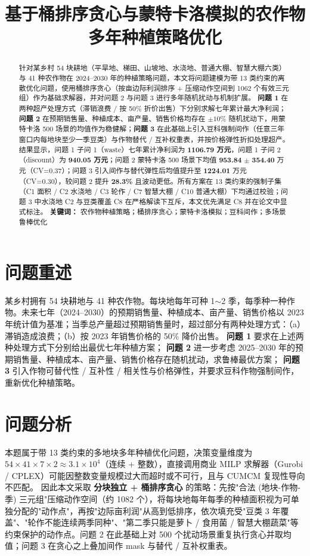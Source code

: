 \documentclass[UTF8,a4paper,12pt]{ctexart}
\title{基于桶排序贪心与蒙特卡洛模拟的农作物多年种植策略优化}
\author{}
\date{}
\begin{document}
\maketitle
\thispagestyle{plain}

\begin{abstract}
针对某乡村 54 块耕地（平旱地、梯田、山坡地、水浇地、普通大棚、智慧大棚六类）与 41 种农作物在 2024--2030 年的种植策略问题，本文将问题建模为带 13 类约束的离散优化问题，使用桶排序贪心（按亩边际利润排序 + 压缩动作空间到 1062 个有效三元组）作为基础求解器，并对问题 2 与问题 3 进行多年随机扰动与机制扩展。
\textbf{问题 1} 在两种超产处理方式（滞销浪费 / 按 50\% 折价出售）下分别求解七年累计最大净利润；\textbf{问题 2} 在预期销售量、种植成本、亩产量、销售价格均存在 $\pm 10\%$ 随机扰动下，用蒙特卡洛 500 场景的均值作为稳健解；\textbf{问题 3} 在此基础上引入豆科强制间作（任意三年窗口内每地块至少一季豆类）与作物替代 / 互补权重表，并按价格弹性折扣处理超产。结果显示，问题 1 子问 1（waste）七年累计净利润为 \textbf{1106.79 万元}，问题 1 子问 2（discount）为 \textbf{940.05 万元}；问题 2 蒙特卡洛 500 场景下均值 \textbf{953.84} $\pm$ \textbf{354.40} 万元（CV=0.37）；问题 3 引入间作与替代弹性后均值提升至 \textbf{1224.01} 万元（CV=0.30），较问题 2 提升 \textbf{28.3\%} 且波动更低。所有方案在 13 类约束的强制子集（C1 面积 / C2 水浇地 / C3 轮作 / C7 智慧大棚 / C10 普通大棚）下均通过校验；问题 3 中水浇地 C2 与豆类覆盖 C8 在严格解读下互斥，本文优先满足 C8 并在论文中显式标注。
\textbf{关键词：} 农作物种植策略；桶排序贪心；蒙特卡洛模拟；豆科间作；多场景鲁棒优化
\end{abstract}
\newpage

\section{问题重述}
某乡村拥有 54 块耕地与 41 种农作物。每块地每年可种 1$\sim$2 季，每季种一种作物。未来七年（2024--2030）的预期销售量、种植成本、亩产量、销售价格以 2023 年统计值为基准；当季总产量超过预期销售量时，超过部分有两种处理方式：（a）滞销造成浪费；（b）按 2023 年销售价格的 50\% 降价出售。
\textbf{问题 1} 要求在上述两种处理方式下分别给出最优七年种植方案；
\textbf{问题 2} 进一步考虑 2025--2030 年的预期销售量、种植成本、亩产量、销售价格存在随机扰动，求鲁棒最优方案；
\textbf{问题 3} 引入作物可替代性 / 互补性 / 相关性与价格弹性，并要求豆科作物强制间作，重新优化种植策略。

\section{问题分析}
本题属于带 13 类约束的多地块多年种植优化问题，决策变量维度为 $54 \times 41 \times 7 \times 2 \approx 3.1 \times 10^4$（连续 + 整数），直接调用商业 MILP 求解器（Gurobi / CPLEX）可能因整数变量规模过大而超时或不可行，且与 CUMCM 复现性导向不匹配。
因此本文采取 \textbf{分块独立 + 桶排序贪心} 的策略：先按"合法 (地块-作物-季) 三元组"压缩动作空间（约 1082 个），将每块地每年每季的种植面积视为可单独分配的"动作点"，再按"边际亩利润"从高到低排序，依次填充受"豆类 3 年覆盖"、"轮作不能连续两季同种"、"第二季只能是萝卜 / 食用菌 / 智慧大棚蔬菜"等约束保护的动作点。问题 2 在此基础上对 500 个扰动场景重复执行贪心并取均值；问题 3 在贪心之上叠加间作 mask 与替代 / 互补权重表。
\end{document}

